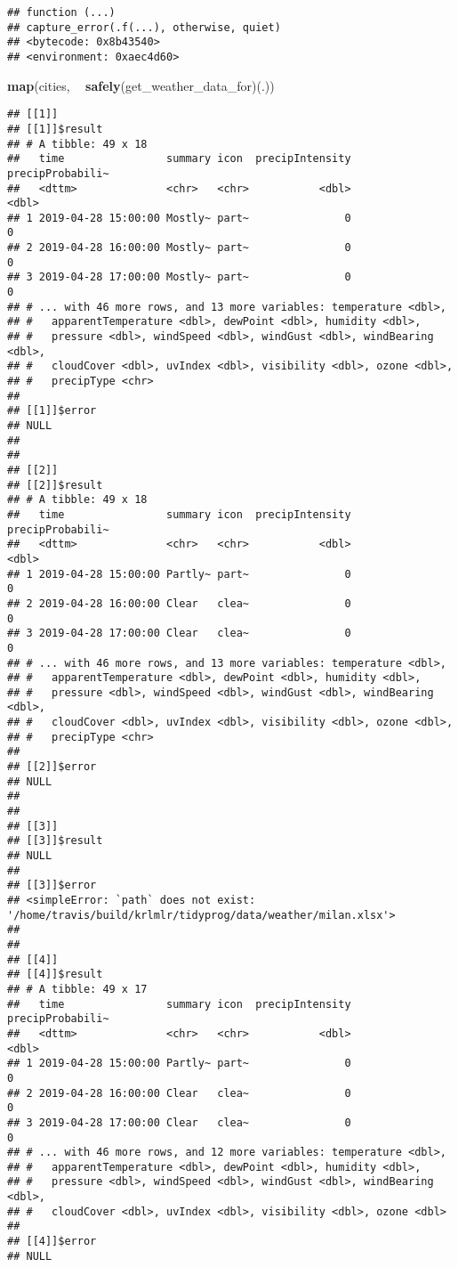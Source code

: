 \documentclass[]{book}
\newenvironment{Shaded}{\begin{snugshade}}{\end{snugshade}}
\newcommand{\KeywordTok}[1]{\textcolor[rgb]{0.13,0.29,0.53}{\textbf{#1}}}
\newcommand{\NormalTok}[1]{#1}
\newcommand{\OperatorTok}[1]{\textcolor[rgb]{0.81,0.36,0.00}{\textbf{#1}}}
\newcommand{\StringTok}[1]{\textcolor[rgb]{0.31,0.60,0.02}{#1}}
\begin{document}
\begin{verbatim}
## function (...) 
## capture_error(.f(...), otherwise, quiet)
## <bytecode: 0x8b43540>
## <environment: 0xaec4d60>
\end{verbatim}

\begin{Shaded}
\begin{Highlighting}[]
\KeywordTok{map}\NormalTok{(cities, }\OperatorTok{~}\StringTok{ }\KeywordTok{safely}\NormalTok{(get_weather_data_for)(.))}
\end{Highlighting}
\end{Shaded}

\begin{verbatim}
## [[1]]
## [[1]]$result
## # A tibble: 49 x 18
##   time                summary icon  precipIntensity precipProbabili~
##   <dttm>              <chr>   <chr>           <dbl>            <dbl>
## 1 2019-04-28 15:00:00 Mostly~ part~               0                0
## 2 2019-04-28 16:00:00 Mostly~ part~               0                0
## 3 2019-04-28 17:00:00 Mostly~ part~               0                0
## # ... with 46 more rows, and 13 more variables: temperature <dbl>,
## #   apparentTemperature <dbl>, dewPoint <dbl>, humidity <dbl>,
## #   pressure <dbl>, windSpeed <dbl>, windGust <dbl>, windBearing <dbl>,
## #   cloudCover <dbl>, uvIndex <dbl>, visibility <dbl>, ozone <dbl>,
## #   precipType <chr>
## 
## [[1]]$error
## NULL
## 
## 
## [[2]]
## [[2]]$result
## # A tibble: 49 x 18
##   time                summary icon  precipIntensity precipProbabili~
##   <dttm>              <chr>   <chr>           <dbl>            <dbl>
## 1 2019-04-28 15:00:00 Partly~ part~               0                0
## 2 2019-04-28 16:00:00 Clear   clea~               0                0
## 3 2019-04-28 17:00:00 Clear   clea~               0                0
## # ... with 46 more rows, and 13 more variables: temperature <dbl>,
## #   apparentTemperature <dbl>, dewPoint <dbl>, humidity <dbl>,
## #   pressure <dbl>, windSpeed <dbl>, windGust <dbl>, windBearing <dbl>,
## #   cloudCover <dbl>, uvIndex <dbl>, visibility <dbl>, ozone <dbl>,
## #   precipType <chr>
## 
## [[2]]$error
## NULL
## 
## 
## [[3]]
## [[3]]$result
## NULL
## 
## [[3]]$error
## <simpleError: `path` does not exist: '/home/travis/build/krlmlr/tidyprog/data/weather/milan.xlsx'>
## 
## 
## [[4]]
## [[4]]$result
## # A tibble: 49 x 17
##   time                summary icon  precipIntensity precipProbabili~
##   <dttm>              <chr>   <chr>           <dbl>            <dbl>
## 1 2019-04-28 15:00:00 Partly~ part~               0                0
## 2 2019-04-28 16:00:00 Clear   clea~               0                0
## 3 2019-04-28 17:00:00 Clear   clea~               0                0
## # ... with 46 more rows, and 12 more variables: temperature <dbl>,
## #   apparentTemperature <dbl>, dewPoint <dbl>, humidity <dbl>,
## #   pressure <dbl>, windSpeed <dbl>, windGust <dbl>, windBearing <dbl>,
## #   cloudCover <dbl>, uvIndex <dbl>, visibility <dbl>, ozone <dbl>
## 
## [[4]]$error
## NULL
\end{verbatim}
\end{document}
